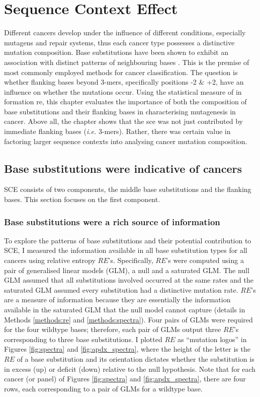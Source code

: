 \chapter{Sequence Context Effect}\label{sce}

Different cancers develop under the influence of different conditions, especially mutagens and repair systems, thus each cancer type possesses a distinctive mutation composition. Base substitutions have been shown to exhibit an association with distinct patterns of neighbouring bases \citep{Zhu2017,Zhu2020,Vinson2012CGMethylation}. This is the premise of most commonly employed methods for cancer classification. The question is whether flanking bases beyond 3-mers, specifically positions -2 \& +2, have an influence on whether the mutations occur. Using the statistical measure of in formation \gls{re}, this chapter evaluates the importance of both the composition of base substitutions and their flanking bases in characterising mutagenesis in cancer. Above all, the chapter shows that the \gls{sce} was not just contributed by immediate flanking bases (\textit{i.e.} 3-mers). Rather, there was certain value in factoring larger sequence contexts into analysing cancer mutation composition.

\section{Base substitutions were indicative of cancers}
SCE consists of two components, the middle base substitutions and the flanking bases. This section focuses on the first component.

\subsection{Base substitutions were a rich source of information}
To explore the patterns of base substitutions and their potential contribution to SCE, I measured the information available in all base substitution types for all cancers using relative entropy $RE$'s. Specifically, $RE$'s were computed using a pair of generalised linear models (GLM), a null and a saturated GLM. The null GLM assumed that all substitutions involved occurred at the same rates and the saturated GLM assumed every substitution had a distinctive mutation rate. $RE$'s are a measure of information because they are essentially the information available in the saturated GLM that the null model cannot capture (details in Methods \ref{methods:re} and \ref{methods:spectra}). Four pairs of GLMs were required for the four wildtype bases; therefore, each pair of GLMs output three $RE$'s corresponding to three base substitutions. I plotted $RE$ as ``mutation logos'' in Figures \ref{fig:spectra} and \ref{fig:apdx_spectra}, where the height of the letter is the $RE$ of a base substitution and its orientation dictates whether the substitution is in excess (up) or deficit (down) relative to the null hypothesis. Note that for each cancer (or panel) of Figures \ref{fig:spectra} and \ref{fig:apdx_spectra}, there are four rows, each corresponding to a pair of GLMs for a wildtype base. 

